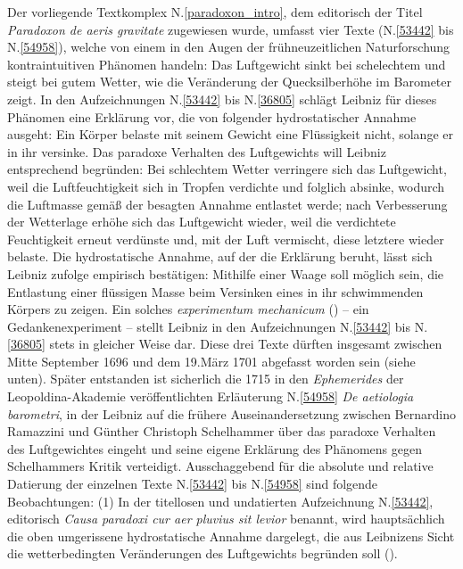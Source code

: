 \footnotesize%
\pstart%
\noindent%
%
Der vorliegende Textkomplex N.\;\ref{paradoxon_intro}, dem editorisch der Titel \textit{Paradoxon de aeris gravitate} zugewiesen wurde, umfasst vier Texte (N.\;\ref{53442} %
bis N.\;\ref{54958}), welche von einem in den Augen der frühneuzeitlichen Naturforschung kontraintuitiven Phänomen handeln:
Das Luftgewicht sinkt bei schelechtem und steigt bei gutem Wetter, wie die Veränderung der Quecksilberhöhe im Barometer zeigt.
In den Aufzeichnungen N.\;\ref{53442} bis N.\;\ref{36805} schlägt Leibniz für dieses Phänomen eine Erklärung vor, die von folgender hydrostatischer Annahme ausgeht:
Ein Körper belaste mit seinem Gewicht eine Flüssigkeit nicht, solange er in ihr versinke.
Das paradoxe Verhalten des Luftgewichts will Leibniz entsprechend begründen:
Bei schlechtem Wetter verringere sich das Luftgewicht, weil die Luftfeuchtigkeit sich in Tropfen verdichte und folglich \glqq absinke\grqq, wodurch die Luftmasse gemäß der besagten Annahme entlastet werde;
nach Verbesserung der Wetterlage erhöhe sich das Luftgewicht wieder, weil die verdichtete Feuchtigkeit erneut verdünste und, mit der Luft vermischt, diese letztere wieder belaste.
Die hydrostatische Annahme, auf der die Erklärung beruht, lässt sich Leibniz zufolge empirisch bestätigen:
Mithilfe einer Waage soll möglich sein, die Entlastung einer flüssigen Masse beim Versinken eines in ihr schwimmenden Körpers zu zeigen.
Ein solches \textit{experimentum mechanicum} () -- ein Gedankenexperiment -- stellt Leibniz in den Aufzeichnungen N.\;\ref{53442} bis N.\;\ref{36805} stets in gleicher Weise dar.
Diese drei Texte dürften insgesamt zwischen Mitte September 1696 und dem 19.\;März 1701 abgefasst worden sein (siehe unten).
Später entstanden ist sicherlich die 1715 in den \textit{Ephemerides} der Leopoldina-Akademie veröffentlichten Erläuterung N.\;\ref{54958} \textit{De aetiologia barometri}, in der Leibniz auf die frühere Auseinandersetzung zwischen Bernardino Ramazzini und Günther Christoph Schelhammer über das paradoxe Verhalten des Luftgewichtes eingeht und seine eigene Erklärung des Phänomens gegen Schelhammers Kritik verteidigt.
Ausschaggebend für die absolute und relative Datierung der einzelnen Texte N.\;\ref{53442} bis N.\;\ref{54958} sind folgende Beobachtungen:
\pend%
\pstart%
(1)
In der titellosen und undatierten Aufzeichnung N.\;\ref{53442}, editorisch \textit{Causa paradoxi cur aer pluvius sit levior} benannt, wird hauptsächlich die oben umgerissene hydrostatische Annahme dargelegt, die aus Leibnizens Sicht die wetterbedingten Veränderungen des Luftgewichts begründen soll ().
